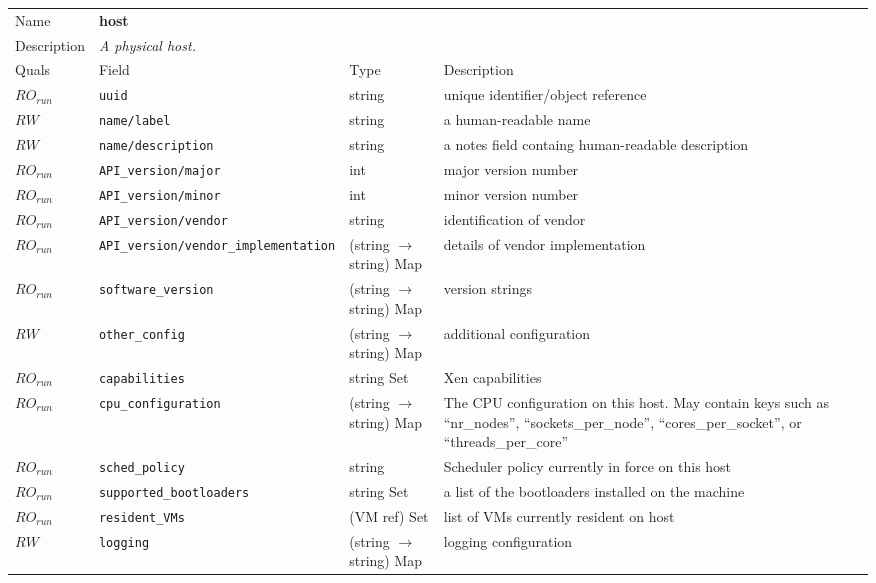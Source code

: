 \begin{longtable}{|lllp{}|}
\hline
\multicolumn{1}{|l}{Name} & \multicolumn{3}{l|}{\bf host} \\
\multicolumn{1}{|l}{Description} & \multicolumn{3}{l|}{\parbox{11cm}{\em A
physical host.}} \\
\hline
Quals & Field & Type & Description \\
\hline
$\mathit{RO}_\mathit{run}$ &  {\tt uuid} & string & unique identifier/object reference \\
$\mathit{RW}$ &  {\tt name/label} & string & a human-readable name \\
$\mathit{RW}$ &  {\tt name/description} & string & a notes field containg human-readable description \\
$\mathit{RO}_\mathit{run}$ &  {\tt API\_version/major} & int & major version number \\
$\mathit{RO}_\mathit{run}$ &  {\tt API\_version/minor} & int & minor version number \\
$\mathit{RO}_\mathit{run}$ &  {\tt API\_version/vendor} & string & identification of vendor \\
$\mathit{RO}_\mathit{run}$ &  {\tt API\_version/vendor\_implementation} & (string $\rightarrow$ string) Map & details of vendor implementation \\
$\mathit{RO}_\mathit{run}$ &  {\tt software\_version} & (string $\rightarrow$ string) Map & version strings \\
$\mathit{RW}$ &  {\tt other\_config} & (string $\rightarrow$ string) Map & additional configuration \\
$\mathit{RO}_\mathit{run}$ &  {\tt capabilities} & string Set & Xen capabilities \\
$\mathit{RO}_\mathit{run}$ &  {\tt cpu\_configuration} & (string $\rightarrow$ string) Map & The CPU configuration on this host.  May contain keys such as ``nr\_nodes'', ``sockets\_per\_node'', ``cores\_per\_socket'', or ``threads\_per\_core'' \\
$\mathit{RO}_\mathit{run}$ &  {\tt sched\_policy} & string & Scheduler policy currently in force on this host \\
$\mathit{RO}_\mathit{run}$ &  {\tt supported\_bootloaders} & string Set & a list of the bootloaders installed on the machine \\
$\mathit{RO}_\mathit{run}$ &  {\tt resident\_VMs} & (VM ref) Set & list of VMs currently resident on host \\
$\mathit{RW}$ &  {\tt logging} & (string $\rightarrow$ string) Map & logging configuration \\

\end{longtable}
